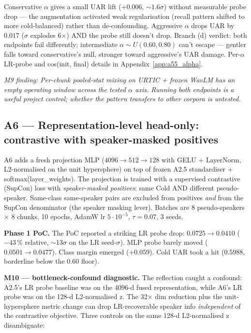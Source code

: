 Conservative $\alpha$ gives a small UAR lift ($+0.006$, $\sim 1.6\sigma$) without measurable probe drop --- the augmentation activated weak regularisation (recall pattern shifted to more cold-balanced) rather than de-confounding. Aggressive $\alpha$ drops UAR by $0.017$ ($\sigma$ explodes 6$\times$) AND the probe still doesn't drop. Branch (d) verdict: both endpoints fail differently; intermediate $\alpha \sim U(0.60, 0.80)$ can't escape --- gentler falls toward conservative's null, stronger toward aggressive's UAR damage. Per-$\alpha$ LR-probe and cos(init, final) details in Appendix~\ref{app:a55_alpha}.

\textit{M9 finding:} \emph{Per-chunk pooled-stat mixing on URTIC + frozen WavLM has an empty operating window across the tested $\alpha$ axis. Running both endpoints is a useful project control; whether the pattern transfers to other corpora is untested.}

\subsection{A6 — Representation-level head-only: contrastive with speaker-masked positives}
\label{ssec:a6}

A6 adds a fresh projection MLP ($4096 \to 512 \to 128$ with GELU + LayerNorm, L2-normalised on the unit hypersphere) on top of frozen A2.5 standardiser + softmax(layer\_weights). The projection is trained with a supervised contrastive (SupCon) loss with \emph{speaker-masked positives}: same Cold AND different pseudo-speaker. Same-class same-speaker pairs are excluded from positives \emph{and} from the SupCon denominator (the speaker masking lever). Batches are 8 pseudo-speakers $\times$ 8 chunks, 10 epochs, AdamW lr $5\cdot 10^{-5}$, $\tau=0.07$, 3 seeds.

\textbf{Phase 1 PoC.} The PoC reported a striking LR probe drop: $0.0725 \to 0.0410$ ($-43\,\%$ relative, $\sim$13$\sigma$ on the LR seed-$\sigma$). MLP probe barely moved ($0.0501 \to 0.0477$). Class margin emerged ($+0.059$). Cold UAR took a hit ($0.5988$, borderline below the 0.60 floor).

\textbf{M10 — bottleneck-confound diagnostic.} The reflection caught a confound: A2.5's LR probe baseline was on the 4096-d fused representation, while A6's LR probe was on the 128-d L2-normalised z. The 32$\times$ dim reduction plus the unit-hypersphere metric change can drop LR-recoverable speaker info \emph{independent} of the contrastive objective. Three controls on the same 128-d L2-normalised z disambiguate:

